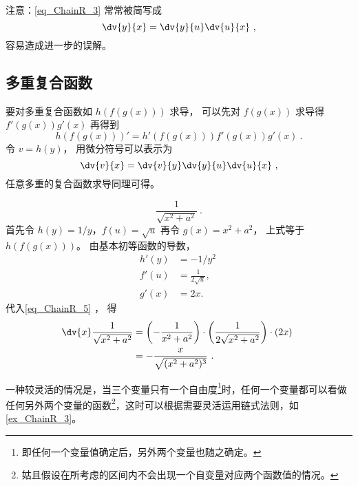 注意：\autoref{eq_ChainR_3} 常常被简写成
\begin{equation}
\dv{y}{x} = \dv{y}{u} \dv{u}{x}~,
\end{equation}
容易造成进一步的误解。

\subsection{多重复合函数}
要对多重复合函数如 $h(f(g(x)))$ 求导， 可以先对 $f(g(x))$ 求导得 $f'(g(x))g'(x)$ 再得到
\begin{equation}
h(f(g(x)))' = h'(f(g(x)))f'(g(x))g'(x)~.
\end{equation}
令 $v = h(y)$， 用微分符号可以表示为
\begin{equation}
\dv{v}{x} = \dv{v}{y}\dv{y}{u}\dv{u}{x}~,
\end{equation}
任意多重的复合函数求导同理可得。

\begin{example}{}
\begin{equation}
\frac{1}{\sqrt{x^2+a^2}}~.
\end{equation}
首先令 $h(y) = 1/y$，$f(u) = \sqrt{u}$ 再令 $g(x) = x^2+a^2$， 上式等于 $h(f(g(x)))$。 由基本初等函数的导数，
\begin{equation}
\begin{aligned}
h'(y) &= - 1/y^2 \\
f'(u) &=  \frac{1}{2 \sqrt{u}}, \\
g'(x) &= 2x.
\end{aligned}~
\end{equation}
代入\autoref{eq_ChainR_5} ， 得
\begin{equation}
\begin{aligned}
\dv{x} \frac{1}{\sqrt{x^2+a^2}} &= \left(- {1 \over x^2 + a^2}\right) \cdot \left( {1 \over 2 \sqrt{x^2 + a^2}} \right) \cdot \left( 2 x \right) \\
&= -\frac{x}{\sqrt{(x^2+a^2)^3}}~.
\end{aligned}~
\end{equation}

\end{example}

一种较灵活的情况是，当三个变量只有一个自由度\footnote{即任何一个变量值确定后，另外两个变量也随之确定。}时，任何一个变量都可以看做任何另外两个变量的函数\footnote{姑且假设在所考虑的区间内不会出现一个自变量对应两个函数值的情况。}，这时可以根据需要灵活运用链式法则，如\autoref{ex_ChainR_3}。

